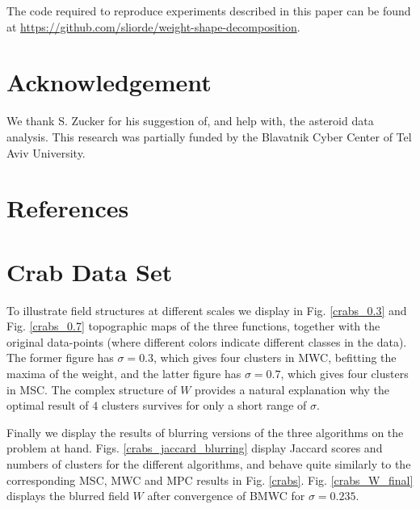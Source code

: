 \documentclass[preprint,12pt]{elsarticle}
\begin{document}
The code required to reproduce experiments described in this paper can be found at \url{https://github.com/sliorde/weight-shape-decomposition}.

























\section*{Acknowledgement}
\label{acknowledgments}
We thank S. Zucker for his suggestion of, and help with, the asteroid data analysis.
This research was partially funded by the Blavatnik Cyber Center of Tel Aviv University.

\section*{References}
 



\appendix
\section{Crab Data Set}
\label{crab_apndx}
To illustrate field structures at different scales we display in Fig. \ref{crabs_0.3} and Fig. \ref{crabs_0.7} topographic maps of the three functions, together with the original data-points (where different colors indicate different classes in the data). The former figure has $\sigma=0.3$, which gives four clusters in MWC, befitting the maxima of the weight, and the latter figure has $\sigma=0.7$, which gives four clusters in MSC. The complex structure of $W$ provides a natural explanation why the optimal result of $4$ clusters survives for only a short range of $\sigma$.

Finally we display the results of  blurring versions of the three algorithms on the problem at hand. Figs. \ref{crabs_jaccard_blurring} display Jaccard scores and numbers of clusters for the different algorithms, and behave quite similarly to the corresponding MSC, MWC and MPC results in Fig. \ref{crabs}. Fig. \ref{crabs_W_final} displays the blurred field $W$ after convergence of BMWC for $\sigma=0.235$.
\end{document}
